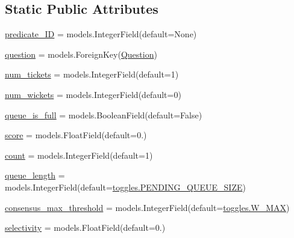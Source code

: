 \subsection*{Static Public Attributes}
\begin{DoxyCompactItemize}
\item 
\mbox{\hyperlink{classdynamicfilterapp_1_1models_1_1_predicate_a283dd268e033ffc2def84793b57df07f}{predicate\+\_\+\+ID}} = models.\+Integer\+Field(default=None)
\item 
\mbox{\hyperlink{classdynamicfilterapp_1_1models_1_1_predicate_a1a1b6bd27a93f9139a2f44d01f7b3ad1}{question}} = models.\+Foreign\+Key(\mbox{\hyperlink{classdynamicfilterapp_1_1models_1_1_question}{Question}})
\item 
\mbox{\hyperlink{classdynamicfilterapp_1_1models_1_1_predicate_a591cb1f50f5ceab96242c91732b52479}{num\+\_\+tickets}} = models.\+Integer\+Field(default=1)
\item 
\mbox{\hyperlink{classdynamicfilterapp_1_1models_1_1_predicate_a318c32bc04e208718aafdebe2c988f2a}{num\+\_\+wickets}} = models.\+Integer\+Field(default=0)
\item 
\mbox{\hyperlink{classdynamicfilterapp_1_1models_1_1_predicate_a65d900ce290e9cb7df3008e0ed2c2fb7}{queue\+\_\+is\+\_\+full}} = models.\+Boolean\+Field(default=False)
\item 
\mbox{\hyperlink{classdynamicfilterapp_1_1models_1_1_predicate_a9fa1482cd696e2f0c104e04a9d46a29d}{score}} = models.\+Float\+Field(default=0.)
\item 
\mbox{\hyperlink{classdynamicfilterapp_1_1models_1_1_predicate_ae11b3deb3de3df7dc48e439074023e35}{count}} = models.\+Integer\+Field(default=1)
\item 
\mbox{\hyperlink{classdynamicfilterapp_1_1models_1_1_predicate_a1bdc57110df8b3c72e240a7f100b4096}{queue\+\_\+length}} = models.\+Integer\+Field(default=\mbox{\hyperlink{namespacedynamicfilterapp_1_1toggles_a642cb0e1f266db761b270ea65af5425a}{toggles.\+P\+E\+N\+D\+I\+N\+G\+\_\+\+Q\+U\+E\+U\+E\+\_\+\+S\+I\+ZE}})
\item 
\mbox{\hyperlink{classdynamicfilterapp_1_1models_1_1_predicate_a8bd4e3573ed7514dc98a1615fe047c23}{consensus\+\_\+max\+\_\+threshold}} = models.\+Integer\+Field(default=\mbox{\hyperlink{namespacedynamicfilterapp_1_1toggles_add63171ca968cbd5ca4d60dfbf9a2746}{toggles.\+W\+\_\+\+M\+AX}})
\item 
\mbox{\hyperlink{classdynamicfilterapp_1_1models_1_1_predicate_af0e245c39a758c26c7eadd206d81ae15}{selectivity}} = models.\+Float\+Field(default=0.)

\end{DoxyCompactItemize}

